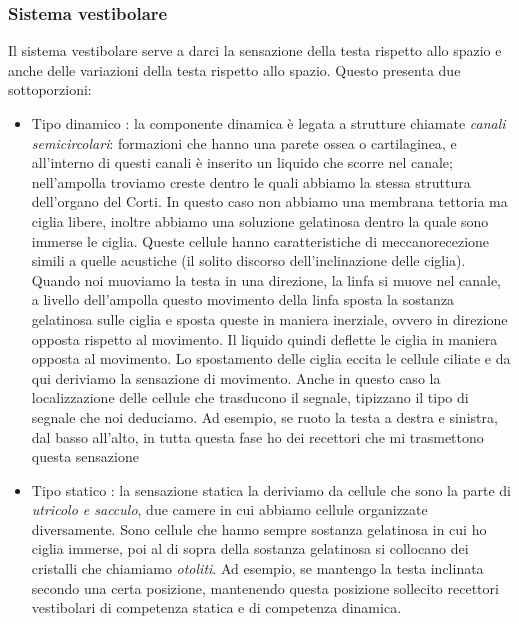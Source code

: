 \documentclass[a4paper,12pt]{article}
\begin{document}
\subsubsection{Sistema vestibolare}
Il sistema vestibolare serve a darci la sensazione della testa rispetto allo spazio e anche delle variazioni della testa rispetto allo spazio. Questo presenta due sottoporzioni:

\begin{itemize}
\item{Tipo dinamico : la componente dinamica è legata a strutture chiamate \emph{canali semicircolari}: formazioni che hanno una parete ossea o cartilaginea, e all'interno di questi canali è inserito un liquido che scorre nel canale; nell'ampolla troviamo creste dentro le quali abbiamo la stessa struttura dell'organo del Corti. In questo caso non abbiamo una membrana tettoria ma ciglia libere, inoltre abbiamo una soluzione gelatinosa dentro la quale sono immerse le ciglia. Queste cellule hanno caratteristiche di meccanorecezione simili a quelle acustiche (il solito discorso dell'inclinazione delle ciglia). Quando noi muoviamo la testa in una direzione, la linfa si muove nel canale, a livello dell'ampolla questo movimento della linfa sposta la sostanza gelatinosa sulle ciglia e sposta queste in maniera inerziale, ovvero in direzione opposta rispetto al movimento. Il liquido quindi deflette le ciglia in maniera opposta al movimento. Lo spostamento delle ciglia eccita le cellule ciliate e da qui deriviamo la sensazione di movimento. Anche in questo caso la localizzazione delle cellule che trasducono il segnale, tipizzano il tipo di segnale che noi deduciamo. Ad esempio, se ruoto la testa a destra e sinistra, dal basso all'alto, in tutta questa fase ho dei recettori che mi trasmettono questa sensazione}
\item{Tipo statico : la sensazione statica la deriviamo da cellule che sono la parte di \emph{utricolo e sacculo}, due camere in cui abbiamo cellule organizzate diversamente. Sono cellule che hanno sempre sostanza gelatinosa in cui ho ciglia immerse, poi al di sopra della sostanza gelatinosa si collocano dei cristalli che chiamiamo \emph{otoliti}. Ad esempio, se mantengo la testa inclinata secondo una certa posizione, mantenendo questa posizione sollecito recettori vestibolari di competenza statica e di competenza dinamica.}
\end{itemize}
\end{document}
